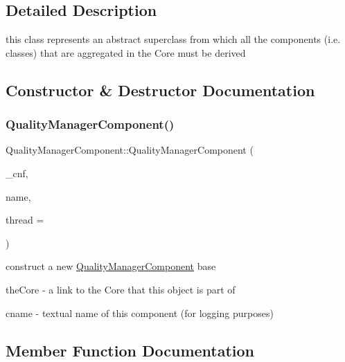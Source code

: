 \subsection{Detailed Description}
this class represents an abstract superclass from which all the components (i.\+e. classes) that are aggregated in the Core must be derived 

\subsection{Constructor \& Destructor Documentation}
\mbox{\label{classQualityManagerComponent_aa4185d8564d0ef37f12e2564a49aa727}} 
\subsubsection{\texorpdfstring{Quality\+Manager\+Component()}{QualityManagerComponent()}}
{\footnotesize\ttfamily Quality\+Manager\+Component\+::\+Quality\+Manager\+Component (\begin{DoxyParamCaption}\item[{\hyperlink{classConfigManager}{Config\+Manager} $\ast$}]{\+\_\+cnf,  }\item[{string}]{name,  }\item[{int}]{thread = {} }\end{DoxyParamCaption})}



construct a new \hyperlink{classQualityManagerComponent}{Quality\+Manager\+Component} base 

\begin{DoxyItemize}
\item {\ttfamily the\+Core} -\/ a link to the Core that this object is part of \item {\ttfamily cname} -\/ textual name of this component (for logging purposes) \end{DoxyItemize}


\subsection{Member Function Documentation}
\mbox{\label{classQualityManagerComponent_ac3b9205c9c702674ae1967b218bb000b}} 
